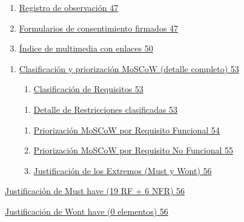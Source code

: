 \documentclass[
]{article}
\begin{document}
\begin{enumerate}
\def\labelenumi{\arabic{enumi}.}
\setcounter{enumi}{4}
\item
  \hyperref[registro-de-observaciuxf3n]{Registro de observación 47}
\item
  \hyperref[formularios-de-consentimiento-firmados]{Formularios de
  consentimiento firmados 47}
\item
  \hyperref[indice-de-multimedia-con-enlaces]{Índice de multimedia
  con enlaces 50}
\end{enumerate}

\begin{enumerate}
\def\labelenumi{\Alph{enumi}.}
\setcounter{enumi}{2}
\item
  \hyperref[clasificaciuxf3n-y-priorizaciuxf3n-moscow-detalle-completo]{Clasificación
  y priorización MoSCoW (detalle completo) 53}

  \begin{enumerate}
  \def\labelenumii{\arabic{enumii}.}
  \item
    \hyperref[_bookmark101]{Clasificación de Requisitos 53}
  \end{enumerate}

  \begin{enumerate}
  \def\labelenumii{\arabic{enumii}.}
  \setcounter{enumii}{1}
  \item
    \hyperref[_bookmark102]{Detalle de Restricciones clasificadas 53}
  \end{enumerate}

  \begin{enumerate}
  \def\labelenumii{\arabic{enumii}.}
  \setcounter{enumii}{2}
  \item
    \hyperref[_bookmark103]{Priorización MoSCoW por Requisito Funcional
    54}
  \item
    \hyperref[priorizaciuxf3n-moscow-por-requisito-no-funcional]{Priorización
    MoSCoW por Requisito No Funcional 55}
  \item
    \hyperref[_bookmark107]{Justificación de los Extremos (Must y
    Won\textquotesingle t) 56}
  \end{enumerate}
\end{enumerate}

\hyperref[_bookmark108]{Justificación de Must have (19 RF + 6 NFR) 56}

\hyperref[justificaciuxf3n-de-wont-have-0-elementos]{Justificación de
Won\textquotesingle t have (0 elementos) 56}
\end{document}

